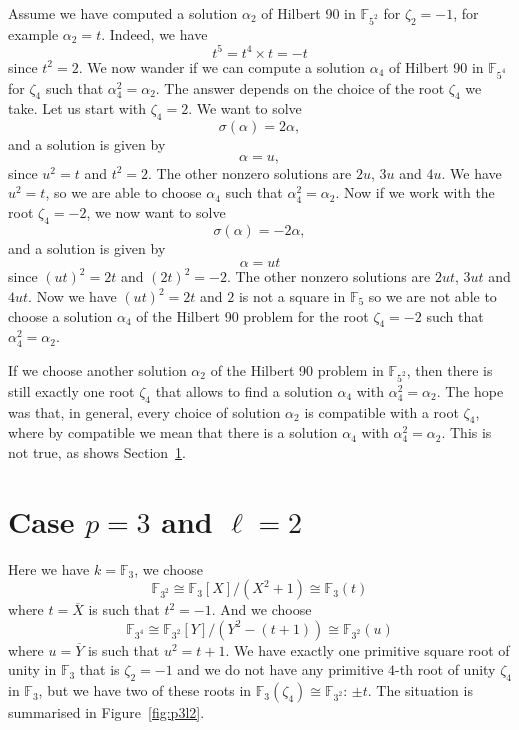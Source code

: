 \documentclass[a4paper,11pt]{article}
\begin{document}
Assume we have computed a solution $\alpha_2$ of Hilbert 90 in
$\mathbb{F}_{5^2}$ for $\zeta_2=-1$, for example $\alpha_2=t$. Indeed, we have 
\[
  t^5 = t^4\times t = -t
\]
since $t^2=2$. We now wander if we can compute a solution $\alpha_4$ of Hilbert
90 in $\mathbb{F}_{5^4}$ for $\zeta_4$ such that $\alpha_4^2=\alpha_2$. The
answer depends on the choice of the root $\zeta_4$ we take. Let us start with
$\zeta_4 = 2$. We want to solve
\[
  \sigma(\alpha) = 2\alpha,
\]
and a solution is given by 
\[
  \alpha = u,
\]
since $u^2 = t$ and $t^2 = 2$. The other nonzero solutions are $2u$, $3u$ and
$4u$. We have $u^2 = t$, so we are able to choose $\alpha_4$ such that
$\alpha_4^2 = \alpha_2$. Now if we work with the root $\zeta_4=-2$, we now want
to solve
\[
  \sigma(\alpha) = -2\alpha,
\]
and a solution is given by
\[
  \alpha = ut
\]
since $(ut)^2 = 2t$ and $(2t)^2 = -2$. The other nonzero solutions are $2ut$, $3ut$ and
$4ut$. Now we have $(ut)^2 = 2t$ and $2$ is not a square in $\mathbb{F}_5$ so we
are not able to choose a solution $\alpha_4$ of the Hilbert 90 problem for the
root $\zeta_4=-2$ such that $\alpha_4^2=\alpha_2$.

If we choose another solution $\alpha_2$ of the Hilbert 90 problem in
$\mathbb{F}_{5^2}$, then there is still exactly one root $\zeta_4$ that allows to find a
solution $\alpha_4$ with $\alpha_4^2=\alpha_2$. The hope was that, in general,
every choice of solution $\alpha_2$ is compatible with a root $\zeta_4$, where by
compatible we mean that there is a solution $\alpha_4$ with
$\alpha_4^2=\alpha_2$. This is not true, as shows Section~\ref{sec:p3l2}.

\section{Case $p=3$ and $\ell=2$}
\label{sec:p3l2}

Here we have $k=\mathbb{F}_3$,
we choose
\[
  \mathbb{F}_{3^2}\cong\mathbb{F}_3[X]/(X^2+1)\cong\mathbb{F}_3(t)
\]
where
$t=\overline X$ is such that $t^2=-1$. And we choose 
\[
  \mathbb{F}_{3^4}\cong
\mathbb{F}_{3^2}[Y]/(Y^2-(t+1))\cong \mathbb{F}_{3^2}(u)
\]
where $u=\overline
Y$ is such that $u^2 = t+1$. We have exactly one primitive square root of
unity in $\mathbb{F}_3$ that is $\zeta_2 = -1$ and we do not have any primitive $4$-th
root of unity $\zeta_4$ in $\mathbb{F}_3$, but we have two of these roots in
$\mathbb{F}_3(\zeta_4)\cong \mathbb{F}_{3^2}$: $\pm t$. The situation is
summarised in Figure~\ref{fig:p3l2}.
\end{document}
